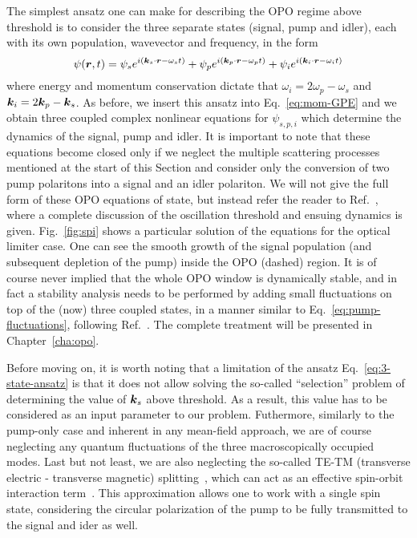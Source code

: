 The simplest ansatz one can make for describing the OPO regime above
threshold is to consider the three separate states (signal, pump and
idler), each with its own population, wavevector and frequency, in the
form~\cite{Ciuti_2000,Whittaker2001,Whittaker_2005,Gippius2004}
%
\begin{equation}\label{eq:3-state-ansatz}
  \psi(\bm{r},t) = \psi_s e^{i (\bm{k}_s \cdot \bm{r}- \omega_s t)} + \psi_p e^{i (\bm{k}_p \cdot \bm{r}- \omega_p t)} + \psi_i e^{i (\bm{k}_i \cdot \bm{r}- \omega_i t)}
\end{equation}
% 
where energy and momentum conservation dictate that
$\omega_i = 2\omega_p - \omega_s$ and $\bm{k}_i = 2\bm{k}_p - \bm{k}_s$. As
before, we insert this ansatz into Eq.~\eqref{eq:mom-GPE} and we
obtain three coupled complex nonlinear equations for $\psi_{s,p,i}$
which determine the dynamics of the signal, pump and idler. It is
important to note that these equations become closed only if we
neglect the multiple scattering processes mentioned at the start of
this Section and consider only the conversion of two pump polaritons
into a signal and an idler polariton. We will not give the full form
of these OPO equations of state, but instead refer the reader to
Ref.~\cite{Wouters_2007_b}, where a complete discussion of the
oscillation threshold and ensuing dynamics is
given. Fig.~\ref{fig:spi} shows a particular solution of the equations
for the optical limiter case. One can see the smooth growth of the
signal population (and subsequent depletion of the pump) inside the
OPO (dashed) region. It is of course never implied that the whole OPO
window is dynamically stable, and in fact a stability analysis needs
to be performed by adding small fluctuations on top of the (now) three
coupled states, in a manner similar to
Eq.~\eqref{eq:pump-fluctuations}, following
Ref.~\cite{Wouters_2007}. The complete treatment will be presented in
Chapter~\ref{cha:opo}.

Before moving on, it is worth noting that a limitation of the ansatz
Eq.~\eqref{eq:3-state-ansatz} is that it does not allow solving the
so-called ``selection'' problem of determining the value of $\bm{k}_s$
above threshold. As a result, this value has to be considered as an
input parameter to our problem. Futhermore, similarly to the pump-only
case and inherent in any mean-field approach, we are of course
neglecting any quantum fluctuations of the three macroscopically
occupied modes. Last but not least, we are also neglecting the
so-called TE-TM (transverse electric - transverse magnetic)
splitting~\cite{Panzarini1999}, which can act as an effective
spin-orbit interaction term~\cite{Kavokin2004}. This approximation
allows one to work with a single spin state, considering the circular
polarization of the pump to be fully transmitted to the signal and
ider as well.


